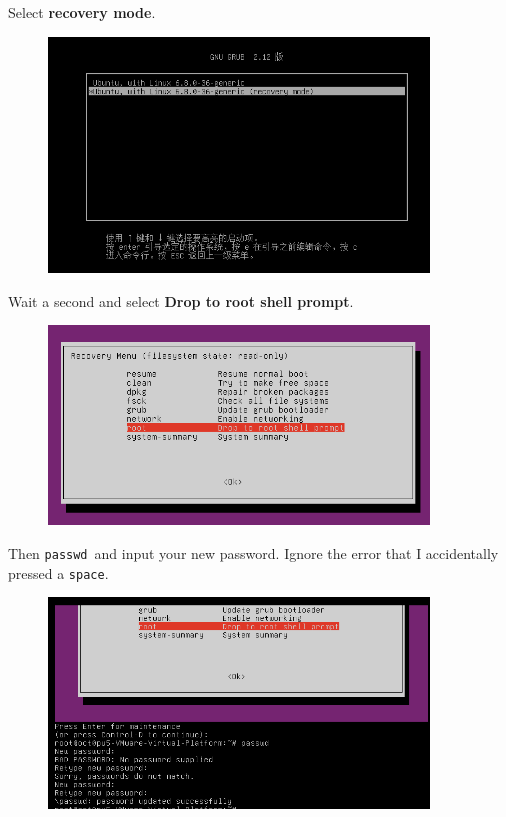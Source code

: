 \documentclass[12pt]{ctexart}
\begin{document}
Select \textbf{recovery mode}.

\begin{figure}[H]
    \centering
    \includegraphics[width=0.9\textwidth,keepaspectratio]{assets/Linux/2.1 SHIT, I forgot my password again!/4.png}
\end{figure}

Wait a second and select \textbf{Drop to root shell prompt}.

\begin{figure}[H]
    \centering
    \includegraphics[width=0.9\textwidth,keepaspectratio]{assets/Linux/2.1 SHIT, I forgot my password again!/5.png}
\end{figure}

Then \texttt{passwd}\ and input your new password. Ignore the error that
I accidentally pressed a \texttt{space}.

\begin{figure}[H]
    \centering
    \includegraphics[width=0.9\textwidth,keepaspectratio]{assets/Linux/2.1 SHIT, I forgot my password again!/6.png}
\end{figure}
\end{document}
